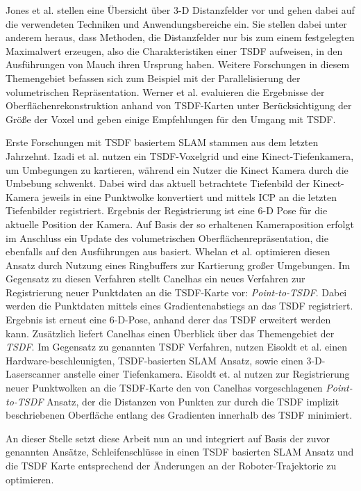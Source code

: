 Jones et al. \cite{jones2006distance} stellen eine Übersicht über 3-D Distanzfelder vor und gehen dabei auf die verwendeten Techniken und Anwendungsbereiche ein. Sie stellen dabei unter anderem heraus, dass Methoden, die Distanzfelder nur bis zum einem festgelegten Maximalwert erzeugen, also die Charakteristiken einer TSDF aufweisen, in den Ausführungen von Mauch \cite{mauch200fast, mauch2003efficient} ihren Ursprung haben. Weitere Forschungen in diesem Themengebiet befassen sich zum Beispiel mit der Parallelisierung der volumetrischen Repräsentation. Werner et al. \cite{werner2014truncated} evaluieren die Ergebnisse der Oberflächenrekonstruktion anhand von TSDF-Karten unter Berücksichtigung der Größe der Voxel und geben einige Empfehlungen für den Umgang mit TSDF.

Erste Forschungen mit TSDF basiertem SLAM stammen aus dem letzten Jahrzehnt.
Izadi et al. \cite{izadi2011kinectfusion} nutzen ein TSDF-Voxelgrid und eine Kinect-Tiefenkamera, um Umbegungen zu kartieren, während ein Nutzer die Kinect Kamera durch die Umbebung schwenkt. Dabei wird das aktuell betrachtete Tiefenbild der Kinect-Kamera jeweils in eine Punktwolke konvertiert und mittels ICP an die letzten Tiefenbilder registriert. Ergebnis der Registrierung ist eine 6-D Pose für die aktuelle Position der Kamera. Auf Basis der so erhaltenen Kameraposition erfolgt im Anschluss ein Update des volumetrischen Oberflächenrepräsentation, die ebenfalls auf den Ausführungen aus \cite{curless1996volumetric} basiert. Whelan et al. \cite{whelan2012kintinuous} optimieren diesen Ansatz durch Nutzung eines Ringbuffers zur Kartierung großer Umgebungen. Im Gegensatz zu diesen Verfahren stellt Canelhas \cite{Canelhas2017TruncatedSD} ein neues Verfahren zur Registrierung neuer Punktdaten an die TSDF-Karte vor: \emph{Point-to-TSDF}. Dabei werden die Punktdaten mittels eines Gradientenabstiegs an das TSDF registriert. Ergebnis ist erneut eine 6-D-Pose, anhand derer das TSDF erweitert werden kann. Zusätzlich liefert Canelhas \cite{Canelhas2017TruncatedSD} einen Überblick über das Themengebiet der \emph{TSDF}. Im Gegensatz zu genannten TSDF Verfahren, nutzen Eisoldt et al. \cite{HATSDF} einen Hardware-beschleunigten, TSDF-basierten SLAM Ansatz, sowie einen 3-D-Laserscanner anstelle einer Tiefenkamera. Eisoldt et. al \cite{HATSDF} nutzen zur Registrierung neuer Punktwolken an die TSDF-Karte den von Canelhas \cite{Canelhas2017TruncatedSD} vorgeschlagenen \emph{Point-to-TSDF} Ansatz, der die Distanzen von Punkten zur durch die TSDF implizit beschriebenen Oberfläche entlang des Gradienten innerhalb des TSDF minimiert.

An dieser Stelle setzt diese Arbeit nun an und integriert auf Basis der zuvor genannten Ansätze, Schleifenschlüsse in einen TSDF basierten SLAM Ansatz und die TSDF Karte entsprechend der Änderungen an der Roboter-Trajektorie zu optimieren.





